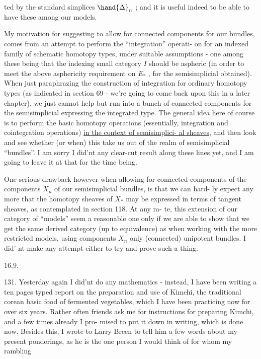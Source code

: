 
ted by the standard simplices $\hand{\Delta}_n$ ; and it is useful indeed to be able
to have these among our models.

My motivation for suggesting to allow for connected components for
our bundles, comes from an attempt to perform the ``integration'' operati-%
on for an indexed family of schematic homotopy types, under suitable
assumptions - one among these being that the indexing small category
$I$ should be aspheric (in order to meet the above asphericity requirement
on $E_*$ , for the semisimplicial  obtained). When just paraphrazing
the construction of integration for ordinary homotopy types (as indicated
in section 69 - we're going to come back upon this in a later chapter),
we just cannot help but run into a bunch of connected components\hand{,} for the 
semisimplicial   expressing the integrated type. The general idea
here of course is to perform the basic homotopy operations (essentially,
integration and cointegration operations) \uline{in the context of semisimplici-%
al sheaves}, and then look and see whether (or when) this  take us
out of the realm of semisimplicial ``bundles''. I am sorry I did'nt 
  any clear-cut result along these lines yet, and I am going to
leave it at that for the time being.

 One serious drawback however when allowing for connected components
of the components $X_n$ of our semisimplicial bundles, is that we can hard-%
ly expect any more that the homotopy sheaves of $X_*$ may be expressed 
in terms of tangent sheaves, as contemplated in section 118. At any ra-%
te, this extension of our category of ``models''   seem a reasonable
one  only if we are able to show that we get the same derived
category (up to equivalence) as when working with the more restricted
models, using  components $X_n$ only (connected) unipotent bundles. I did'%
nt make any attempt either to try and prove such a thing.

16.9.

131. Yesterday again I did'nt do any mathematics - instead, I have
been writing a ten pages typed report on the preparation and use of
Kimchi, the traditional corean basic food of fermented vegetables, which
I have been practicing now for over six years. Rather often friends ask
me for instructions for preparing Kimchi, and a few times already I pro-%
mised to put it down in writing, which is done now. Besides this, I
wrote to Larry Breen to tell him a few words about my present ponderings,
as he is the one person I would think of for whom my  rambling
